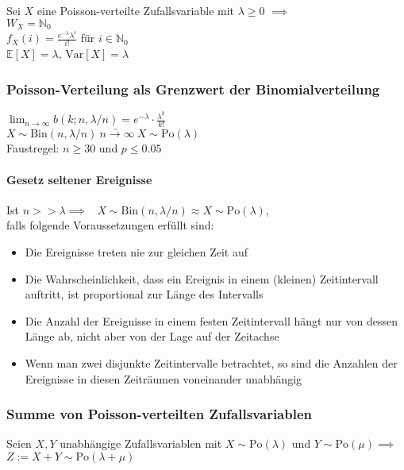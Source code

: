 \documentclass[a4paper,9pt]{extarticle}
\newcommand{\liminfty}[1][n]{\lim_{#1 \to \infty}}
\newcommand{\Var}{\text{Var}}
\begin{document}
Sei $X$ eine Poisson-verteilte Zufallsvariable mit $\lambda ≥ 0$ $\implies$ \\
$W_X = \mathbb{N}_0$ \\
$f_X(i) = \frac{e^{-\lambda}\lambda^i}{i!}$ für $i \in \mathbb{N}_0$ \\

$\mathbb{E}[X] = \lambda$, $\Var[X] = \lambda$

\subsubsection*{Poisson-Verteilung als Grenzwert der Binomialverteilung}
$\liminfty b(k; n, \lambda/n) = e^{-\lambda} ⋅ \frac{\lambda^k}{k!}$ \\
$X \sim \text{Bin}(n, \lambda/n) ~\underrightarrow{n → ∞}~ X \sim \text{Po}(\lambda)$ \\

Faustregel: $n ≥ 30$ und $p ≤ 0.05$

\paragraph*{Gesetz seltener Ereignisse}
Ist $n >> \lambda \implies$ \
$X \sim \text{Bin}(n, \lambda/n) \approx X \sim \text{Po}(\lambda)$, \\
falls folgende Voraussetzungen erfüllt sind:
\begin{itemize}
	\item Die Ereignisse treten nie zur gleichen Zeit auf
	\item Die Wahrscheinlichkeit, dass ein Ereignis in einem (kleinen) Zeitintervall auftritt, ist proportional zur Länge des Intervalls
	\item Die Anzahl der Ereignisse in einem festen Zeitintervall hängt nur von dessen Länge ab, nicht aber von der Lage auf der Zeitachse
	\item Wenn man zwei disjunkte Zeitintervalle betrachtet, so sind die Anzahlen der Ereignisse in diesen Zeiträumen voneinander unabhängig
\end{itemize}

\subsubsection*{Summe von Poisson-verteilten Zufallsvariablen}
Seien $X,Y$ unabhängige Zufallsvariablen mit $X \sim \text{Po}(\lambda)$ und $Y \sim \text{Po}(\mu) \implies$ \\
$Z := X + Y \sim \text{Po}(\lambda + \mu)$
\end{document}
